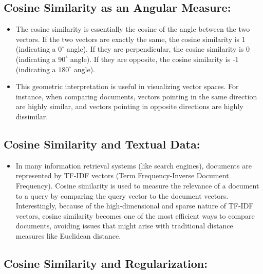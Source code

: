 \documentclass[
  12 pt,
  a4paper,
]{book}
\providecommand{\tightlist}{%
  \setlength{\itemsep}{0pt}\setlength{\parskip}{0pt}}
\numberwithin{equation}{section}
\theoremstyle{plain}      %
\theoremstyle{definition} %
\theoremstyle{remark}     %
\theoremstyle{note}         %
\begin{document}
\hypertarget{cosine-similarity-as-an-angular-measure}{%
\subsection{Cosine Similarity as an Angular
Measure:}\label{cosine-similarity-as-an-angular-measure}}

\begin{itemize}
\tightlist
\item
  The cosine similarity is essentially the cosine of the angle between
  the two vectors. If the two vectors are exactly the same, the cosine
  similarity is 1 (indicating a \(0^{\circ}\) angle). If they are
  perpendicular, the cosine similarity is 0 (indicating a \(90^{\circ}\)
  angle). If they are opposite, the cosine similarity is -1 (indicating
  a \(180^{\circ}\) angle).
\item
  This geometric interpretation is useful in visualizing vector spaces.
  For instance, when comparing documents, vectors pointing in the same
  direction are highly similar, and vectors pointing in opposite
  directions are highly dissimilar.
\end{itemize}

\hypertarget{cosine-similarity-and-textual-data}{%
\subsection{Cosine Similarity and Textual
Data:}\label{cosine-similarity-and-textual-data}}

\begin{itemize}
\tightlist
\item
  In many information retrieval systems (like search engines), documents
  are represented by TF-IDF vectors (Term Frequency-Inverse Document
  Frequency). Cosine similarity is used to measure the relevance of a
  document to a query by comparing the query vector to the document
  vectors. Interestingly, because of the high-dimensional and sparse
  nature of TF-IDF vectors, cosine similarity becomes one of the most
  efficient ways to compare documents, avoiding issues that might arise
  with traditional distance measures like Euclidean distance.
\end{itemize}

\hypertarget{cosine-similarity-and-regularization}{%
\subsection{Cosine Similarity and
Regularization:}\label{cosine-similarity-and-regularization}}
\end{document}
